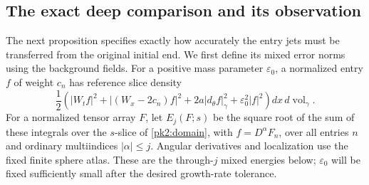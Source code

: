 \subsection{The exact deep comparison and its observation}
\label{pk2:deep-comparison}

The next proposition specifies exactly how accurately the entry jets
must be transferred from the original initial end. We first define
its mixed error norms using the background fields. For a positive
mass parameter $\varepsilon_0$, a normalized entry $f$ of weight
$c_n$ has reference slice density
\begin{equation}\label{pk2:reference-density}
 \frac12\left(|W_tf|^2+|(W_x-2c_n)f|^2
        +2a|d_\theta f|_\gamma^2+\varepsilon_0^2|f|^2\right)
                   dx\,d\operatorname{vol}_\gamma.
\end{equation}
For a normalized tensor array $F$, let $E_j(F;s)$ be the square root
of the sum of these integrals over the $s$-slice of
\eqref{pk2:domain}, with $f=D^\alpha F_n$, over all entries $n$
and ordinary multiindices $|\alpha|\le j$. Angular derivatives and
localization use the fixed finite sphere atlas. These are the
through-$j$ mixed energies below; $\varepsilon_0$ will be fixed
sufficiently small after the desired growth-rate tolerance.

